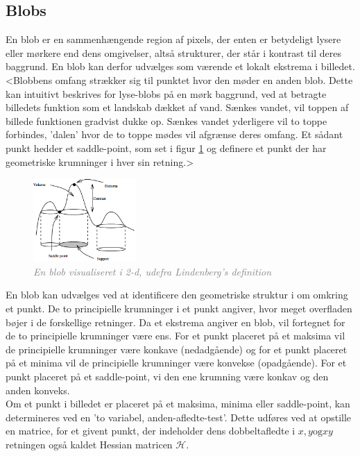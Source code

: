 \subsection{Blobs}\label{sec:blobs}
En blob er en sammenhængende region af pixels, der enten er betydeligt lysere eller mørkere end dens omgivelser, altså strukturer, der står i kontrast til deres baggrund. En blob kan derfor udvælges som værende et lokalt ekstrema i billedet. <Blobbens omfang strækker sig til punktet hvor den møder en anden blob. Dette kan intuitivt beskrives for lyse-blobs på en mørk baggrund, ved at betragte billedets funktion som et landskab dækket af vand. Sænkes vandet, vil toppen af billede funktionen gradvist dukke op. Sænkes vandet yderligere vil to toppe forbindes, 'dalen' hvor de to toppe mødes vil afgrænse deres omfang. Et sådant punkt hedder et saddle-point, som set i figur \ref{fig:lindblob} og definere et punkt der har geometriske krumninger i hver sin retning.>
\begin{figure}[H]
    \centering
    \includegraphics[width=0.35\textwidth]{fig/11.png}
    \vspace{-0.5em}   
    \begin{center}
    \caption{\textcolor{gray}{\footnotesize \textit{
    En blob visualiseret i 2-d, udefra Lindenberg's definition \cite{blob}}}}
    \label{fig:lindblob}
     \end{center}
  \end{figure}
       \vspace{-2.7em}
\noindent
En blob kan udvælges ved at identificere den geometriske struktur i om omkring et punkt. De to principielle krumninger i et punkt angiver, hvor meget overfladen bøjer i de forskellige retninger. Da et ekstrema angiver en blob, vil fortegnet for de to principielle krumninger være ens. For et punkt placeret på et maksima vil de principielle krumninger være konkave (nedadgående) og for et punkt placeret på et minima vil de principielle krumninger være konvekse (opadgående). For et punkt placeret på et saddle-point, vi den ene krumning være konkav og den anden konveks. \\ 
Om et punkt i billedet er placeret på et maksima, minima eller saddle-point, kan determineres ved en 'to variabel, anden-afledte-test'. Dette udføres ved at opstille en matrice, for et givent punkt, der indeholder dens dobbeltafledte i $x, y \text{og} xy$ retningen også kaldet Hessian matricen $\mathcal{H}$.
